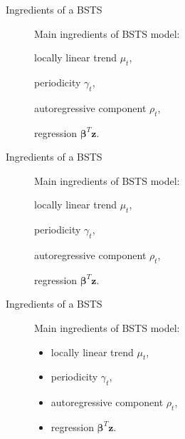 \documentclass{beamer}
\begin{document}
\begin{frame}{Ingredients of a BSTS}
\begin{figure}[H]
	Main ingredients of \alert{BSTS} model:
	\begin{itemize}
		\item locally linear trend \alert{$ \mu_t $},
		\item periodicity \alert{$ \gamma_t $},
		{
			\item autoregressive component \alert{$ \rho_t $},
			\item regression \alert{$ \boldsymbol{\beta}^T\mathbf{z} $}.
		} 
	\end{itemize}
\end{figure}
\end{frame}

\begin{frame}{Ingredients of a BSTS}
\begin{figure}[H]
	Main ingredients of \alert{BSTS} model:
	\begin{itemize}
		\item locally linear trend \alert{$ \mu_t $},
		\item periodicity \alert{$ \gamma_t $},
		\item autoregressive component \alert{$ \rho_t $},
				\transparent{0.25}
		{
			\item regression \alert{$ \boldsymbol{\beta}^T\mathbf{z} $}.
		} 
	\end{itemize}
\end{figure}
\end{frame}

\begin{frame}{Ingredients of a BSTS}
\begin{figure}[H]
	Main ingredients of \alert{BSTS} model:
	\begin{itemize}
		\item locally linear trend \alert{$ \mu_t $},
		\item periodicity \alert{$ \gamma_t $},
		\item autoregressive component \alert{$ \rho_t $},
		\item regression \alert{$ \boldsymbol{\beta}^T\mathbf{z} $}.
	\end{itemize}
\end{figure}
\end{frame}
\end{document}
